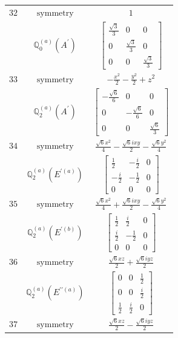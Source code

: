 \documentclass[fleqn,8pt,landscape]{jsarticle}
\begin{document}
\begin{longtable}{ccc}
$ 32 $ & $ \text{symmetry} $ & $ 1 $ \\
$  $ & $ \mathbb{Q}_{0}^{(a)}(A^{\prime}) $ & $ \begin{bmatrix} \frac{\sqrt{3}}{3} & 0 & 0 \\ 0 & \frac{\sqrt{3}}{3} & 0 \\ 0 & 0 & \frac{\sqrt{3}}{3} \end{bmatrix} $ \\ \hline
$ 33 $ & $ \text{symmetry} $ & $ - \frac{x^{2}}{2} - \frac{y^{2}}{2} + z^{2} $ \\
$  $ & $ \mathbb{Q}_{2}^{(a)}(A^{\prime}) $ & $ \begin{bmatrix} - \frac{\sqrt{6}}{6} & 0 & 0 \\ 0 & - \frac{\sqrt{6}}{6} & 0 \\ 0 & 0 & \frac{\sqrt{6}}{3} \end{bmatrix} $ \\ \hline
$ 34 $ & $ \text{symmetry} $ & $ \frac{\sqrt{6} x^{2}}{4} - \frac{\sqrt{6} i x y}{2} - \frac{\sqrt{6} y^{2}}{4} $ \\
$  $ & $ \mathbb{Q}_{2}^{(a)}(E^{\prime(a)}) $ & $ \begin{bmatrix} \frac{1}{2} & - \frac{i}{2} & 0 \\ - \frac{i}{2} & - \frac{1}{2} & 0 \\ 0 & 0 & 0 \end{bmatrix} $ \\ \hline
$ 35 $ & $ \text{symmetry} $ & $ \frac{\sqrt{6} x^{2}}{4} + \frac{\sqrt{6} i x y}{2} - \frac{\sqrt{6} y^{2}}{4} $ \\
$  $ & $ \mathbb{Q}_{2}^{(a)}(E^{\prime(b)}) $ & $ \begin{bmatrix} \frac{1}{2} & \frac{i}{2} & 0 \\ \frac{i}{2} & - \frac{1}{2} & 0 \\ 0 & 0 & 0 \end{bmatrix} $ \\ \hline
$ 36 $ & $ \text{symmetry} $ & $ \frac{\sqrt{6} x z}{2} + \frac{\sqrt{6} i y z}{2} $ \\
$  $ & $ \mathbb{Q}_{2}^{(a)}(E^{\prime\prime(a)}) $ & $ \begin{bmatrix} 0 & 0 & \frac{1}{2} \\ 0 & 0 & \frac{i}{2} \\ \frac{1}{2} & \frac{i}{2} & 0 \end{bmatrix} $ \\ \hline
$ 37 $ & $ \text{symmetry} $ & $ \frac{\sqrt{6} x z}{2} - \frac{\sqrt{6} i y z}{2} $ \\

\end{longtable}
\end{document}
